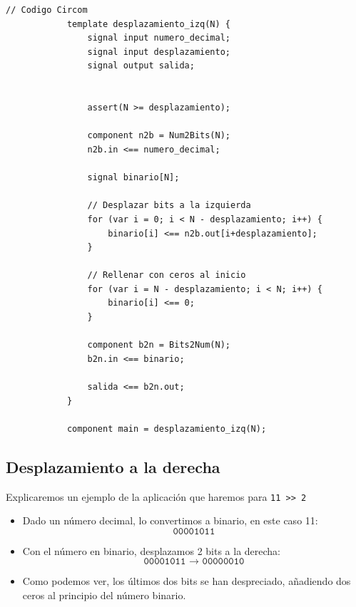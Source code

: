 \documentclass[a4paper,10pt]{article}
\begin{document}
		\begin{lstlisting}[language=Circom]
			// Codigo Circom
			template desplazamiento_izq(N) {
				signal input numero_decimal;
				signal input desplazamiento;
				signal output salida;
				
				
				assert(N >= desplazamiento);
				
				component n2b = Num2Bits(N);
				n2b.in <== numero_decimal;
				
				signal binario[N];
				
				// Desplazar bits a la izquierda
				for (var i = 0; i < N - desplazamiento; i++) {
					binario[i] <== n2b.out[i+desplazamiento];
				}
				
				// Rellenar con ceros al inicio
				for (var i = N - desplazamiento; i < N; i++) {
					binario[i] <== 0;
				}
				
				component b2n = Bits2Num(N);
				b2n.in <== binario;
				
				salida <== b2n.out;
			}
			
			component main = desplazamiento_izq(N);
		\end{lstlisting}
		
		
		\subsection*{Desplazamiento a la derecha}
		\noindent Explicaremos un ejemplo de la aplicación que haremos para \verb|11 >> 2|
		
		\begin{itemize}
			\item Dado un número decimal, lo convertimos a binario, en este caso 11:
			\begin{equation*}
				\texttt{00001011}
			\end{equation*}
			
			\item Con el número en binario, desplazamos 2 bits a la derecha:
			\begin{equation*}
				\texttt{00001011 → 00000010}
			\end{equation*}
			
			\item Como podemos ver, los últimos dos bits se han despreciado, añadiendo dos ceros al principio del número binario.
		\end{itemize}
		
\end{document}
